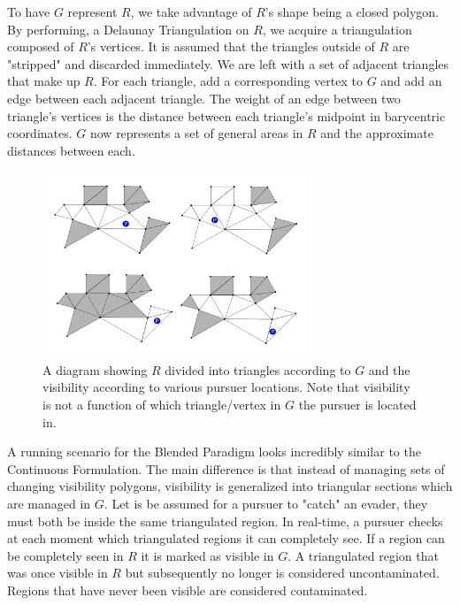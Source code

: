 \documentclass{article}
\begin{document}
To have \(G\) represent \(R\), we take advantage of \(R\)'s shape being a closed polygon. By performing, a Delaunay Triangulation on \(R\), we acquire a triangulation composed of \(R\)'s vertices. \cite{dTri} It is assumed that the triangles outside of \(R\) are "stripped" and discarded immediately. We are left with a set of adjacent triangles that make up \(R\). For each triangle, add a corresponding vertex to \(G\) and add an edge between each adjacent triangle. The weight of an edge between two triangle's vertices is the distance between each triangle's midpoint in barycentric coordinates. \cite{bCenter} \(G\) now represents a set of general areas in \(R\) and the approximate distances between each.

\begin{figure}[htb]
\centering
\includegraphics[width=0.7\textwidth]{"visibility"}
\caption{A diagram showing \(R\) divided into triangles according to \(G\) and the visibility according to various pursuer locations. Note that visibility is not a function of which triangle/vertex in \(G\) the pursuer is located in.}
\end{figure}

A running scenario for the Blended Paradigm looks incredibly similar to the Continuous Formulation. The main difference is that instead of managing sets of changing visibility polygons, visibility is generalized into triangular sections which are managed in \(G\). Let is be assumed for a pursuer to "catch" an evader, they must both be inside the same triangulated region. In real-time, a pursuer checks at each moment which triangulated regions it can completely see. If a region can be completely seen in \(R\) it is marked as visible in \(G\). A triangulated region that was once visible in \(R\) but subsequently no longer is considered uncontaminated. Regions that have never been visible are considered contaminated. 
\end{document}
